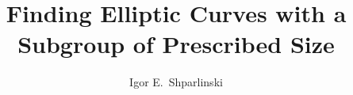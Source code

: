 \documentclass[12pt]{amsart}
\begin{document}
\newtheorem{theorem}{Theorem}
\newtheorem{lemma}[theorem]{Lemma}
\newtheorem{algol}{Algorithm}
\newtheorem{cor}[theorem]{Corollary}
\newtheorem{prop}[theorem]{Proposition}

\newcommand{\comm}[1]{\marginpar{%
\vskip-\baselineskip %
\raggedright\footnotesize
\itshape\hrule\smallskip#1\par\smallskip\hrule}}

\def\cA{{\mathcal A}}
\def\cB{{\mathcal B}}
\def\cC{{\mathcal C}}
\def\cD{{\mathcal D}}
\def\cE{{\mathcal E}}
\def\cF{{\mathcal F}}
\def\cG{{\mathcal G}}
\def\cH{{\mathcal H}}
\def\cI{{\mathcal I}}
\def\cJ{{\mathcal J}}
\def\cK{{\mathcal K}}
\def\cL{{\mathcal L}}
\def\cM{{\mathcal M}}
\def\cN{{\mathcal N}}
\def\cO{{\mathcal O}}
\def\cP{{\mathcal P}}
\def\cQ{{\mathcal Q}}
\def\cR{{\mathcal R}}
\def\cS{{\mathcal S}}
\def\cT{{\mathcal T}}
\def\cU{{\mathcal U}}
\def\cV{{\mathcal V}}
\def\cW{{\mathcal W}}
\def\cX{{\mathcal X}}
\def\cY{{\mathcal Y}}
\def\cZ{{\mathcal Z}}

\def\C{\mathbb{C}}
\def\F{\mathbb{F}}
\def\K{\mathbb{K}}
\def\Z{\mathbb{Z}}
\def\R{\mathbb{R}}
\def\Q{\mathbb{Q}}
\def\N{\mathbb{N}}
\def\M{\textsf{M}}

\def\({\left(}
\def\){\right)}
\def\[{\left[}
\def\]{\right]}
\def\<{\langle}
\def\>{\rangle}

\def\e{e}

\def\eq{\e_q}
\def\fS{{\mathfrak S}}

\def\lcm{{\mathrm{lcm}}\,}

\def\fl#1{\left\lfloor#1\right\rfloor}
\def\rf#1{\left\lceil#1\right\rceil}
\def\mand{\qquad\mbox{and}\qquad}

\def\jt{\widetilde\jmath}
\def\ellmax{\ell_{\rm max}}
\def\llog{\log\log}
\def\disc{{\rm disc}}
\def\cl{{\rm cl}}
\def\Gal{{\rm Gal}}


%


\title[Elliptic Curves with a
Subgroup  of Prescribed Size]{Finding Elliptic Curves with 
a Subgroup of Prescribed Size}

\author{Igor E.~Shparlinski} 
\address{Department of Pure Mathematics, University of 
New South Wales, Sydney, NSW 2052, Australia}
\end{document}
